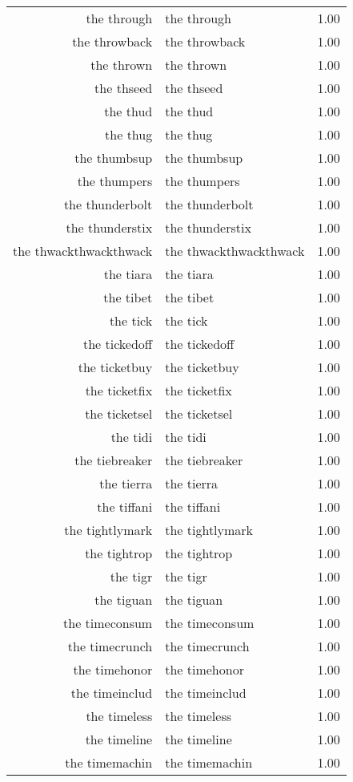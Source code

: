 \begin{table}[ht]
\begin{tabular}{rlr}
  the through & the through & 1.00 \\ 
  the throwback & the throwback & 1.00 \\ 
  the thrown & the thrown & 1.00 \\ 
  the thseed & the thseed & 1.00 \\ 
  the thud & the thud & 1.00 \\ 
  the thug & the thug & 1.00 \\ 
  the thumbsup & the thumbsup & 1.00 \\ 
  the thumpers & the thumpers & 1.00 \\ 
  the thunderbolt & the thunderbolt & 1.00 \\ 
  the thunderstix & the thunderstix & 1.00 \\ 
  the thwackthwackthwack & the thwackthwackthwack & 1.00 \\ 
  the tiara & the tiara & 1.00 \\ 
  the tibet & the tibet & 1.00 \\ 
  the tick & the tick & 1.00 \\ 
  the tickedoff & the tickedoff & 1.00 \\ 
  the ticketbuy & the ticketbuy & 1.00 \\ 
  the ticketfix & the ticketfix & 1.00 \\ 
  the ticketsel & the ticketsel & 1.00 \\ 
  the tidi & the tidi & 1.00 \\ 
  the tiebreaker & the tiebreaker & 1.00 \\ 
  the tierra & the tierra & 1.00 \\ 
  the tiffani & the tiffani & 1.00 \\ 
  the tightlymark & the tightlymark & 1.00 \\ 
  the tightrop & the tightrop & 1.00 \\ 
  the tigr & the tigr & 1.00 \\ 
  the tiguan & the tiguan & 1.00 \\ 
  the timeconsum & the timeconsum & 1.00 \\ 
  the timecrunch & the timecrunch & 1.00 \\ 
  the timehonor & the timehonor & 1.00 \\ 
  the timeinclud & the timeinclud & 1.00 \\ 
  the timeless & the timeless & 1.00 \\ 
  the timeline & the timeline & 1.00 \\ 
  the timemachin & the timemachin & 1.00 \\ 

\end{tabular}
\end{table}
